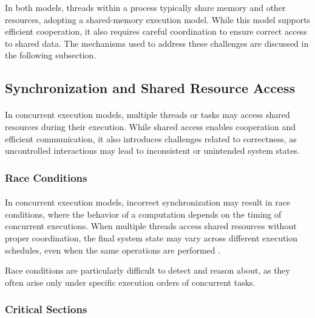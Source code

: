 In both models, threads within a process typically share memory and other resources, adopting a
shared-memory execution model. While this model supports efficient cooperation, it also requires
careful coordination to ensure correct access to shared data. The mechanisms used to address
these challenges are discussed in the following subsection.



\subsection{Synchronization and Shared Resource Access}
\paragraph{}

In concurrent execution models, multiple threads or tasks may access shared resources during
their execution. While shared access enables cooperation and efficient communication, it also
introduces challenges related to correctness, as uncontrolled interactions may lead to
inconsistent or unintended system states.

\subsubsection{Race Conditions}
\paragraph{}

In concurrent execution models, incorrect synchronization may result in race
conditions, where the behavior of a computation depends on the timing of concurrent executions. When multiple threads access shared
resources without proper coordination, the final system state may vary across different
execution schedules, even when the same operations are performed \cite{arpaci2018operating}.

Race conditions are particularly difficult to detect and reason about, as they often arise
only under specific execution orders of concurrent tasks.


\subsubsection{Critical Sections}
\paragraph{}

